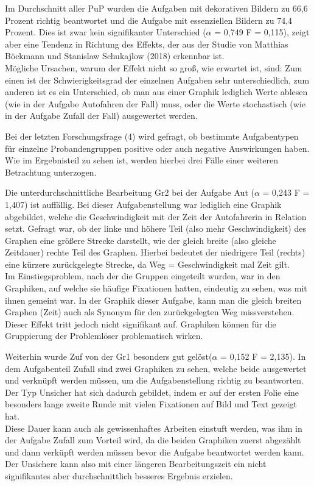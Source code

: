 Im Durchschnitt aller \gls{PuP} wurden die Aufgaben mit dekorativen Bildern zu 66,6 Prozent richtig beantwortet und die Aufgabe mit essenziellen Bildern zu 74,4 Prozent. Dies ist zwar kein signifikanter Unterschied ($\alpha$ = 0,749 F = 0,115), zeigt aber eine Tendenz in Richtung des Effekts, der aus der Studie von Matthias Böckmann und Stanislaw Schukajlow (2018) erkennbar ist. \\Mögliche Ursachen, warum der Effekt nicht so groß, wie erwartet ist, sind: Zum einen ist der Schwierigkeitsgrad der einzelnen Aufgaben sehr unterschiedlich, zum anderen ist es ein Unterschied, ob man aus einer Graphik lediglich Werte ablesen (wie in der Aufgabe Autofahren der Fall) muss, oder die Werte stochastisch (wie in der Aufgabe Zufall der Fall) ausgewertet werden.


Bei der letzten Forschungsfrage (4) wird gefragt, ob bestimmte Aufgabentypen für einzelne Probandengruppen positive oder auch negative Auswirkungen haben. Wie im Ergebnisteil zu sehen ist, werden hierbei drei Fälle einer weiteren Betrachtung unterzogen. 


Die unterdurchschnittliche Bearbeitung \gls{Gr2} bei der Aufgabe \gls{Aut} ($\alpha$ = 0,243 F = 1,407) ist auffällig. Bei dieser Aufgabenstellung war lediglich eine Graphik abgebildet, welche die Geschwindigkeit mit der Zeit der Autofahrerin in Relation setzt. Gefragt war, ob der linke und höhere Teil (also mehr Geschwindigkeit)  des Graphen eine größere Strecke darstellt, wie der gleich breite (also gleiche Zeitdauer) rechte Teil des Graphen.  Hierbei bedeutet der niedrigere Teil (rechts) eine kürzere zurückgelegte Strecke, da  Weg = Geschwindigkeit mal Zeit gilt. \\
Im Einstiegsproblem, nach der die Gruppen eingeteilt wurden, war in den Graphiken, auf welche sie häufige Fixationen hatten, eindeutig zu sehen, was mit ihnen gemeint war. In der Graphik dieser Aufgabe, kann man die gleich breiten Graphen (Zeit) auch als Synonym für den zurückgelegten Weg missverstehen. Dieser Effekt tritt jedoch nicht signifikant auf. Graphiken können für die Gruppierung der Problemlöser problematisch wirken.


Weiterhin wurde \gls{Zuf} von der \gls{Gr1} besonders gut gelöst($\alpha$ = 0,152 F = 2,135). In dem Aufgabenteil Zufall sind zwei Graphiken zu sehen, welche beide ausgewertet und verknüpft werden müssen, um die Aufgabenstellung richtig zu beantworten. Der Typ Unsicher hat sich dadurch gebildet, indem er auf der ersten Folie eine besonders lange zweite Runde mit vielen Fixationen auf Bild und Text gezeigt hat. \\
Diese Dauer kann auch als gewissenhaftes Arbeiten einstuft werden, was ihm in der Aufgabe Zufall zum Vorteil wird, da die beiden Graphiken zuerst abgezählt und dann verküpft werden müssen bevor die Aufgabe beantwortet werden kann. Der Unsichere kann also mit einer längeren Bearbeitungszeit ein nicht signifikantes aber durchschnittlich besseres Ergebnis erzielen. 


